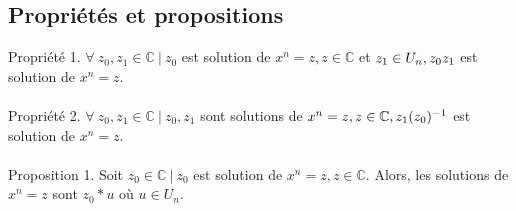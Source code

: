 \documentclass[]{article}
\begin{document}
\subsection{Propriétés et propositions}
\noindent
Propriété 1. $\forall \ z_0, z_1 \in \mathbb{C} \ | \ z_0$ est solution de $x^n = z, z \in \mathbb{C}$ et $z_1 \in U_n,
\\ z_0z_1$ est solution de $x^n = z$.
\\
\\ Propriété 2. $\forall \ z_0, z_1 \in \mathbb{C} \ | \ z_0, z_1$ sont solutions de $x^n = z, z \in \mathbb{C},
\\ z_1(z_0)^{-1}$ est solution de $x^n = z$.
\\
\\ Proposition 1. Soit  $z_0 \in \mathbb{C} \ | \ z_0$ est solution de $x^n = z, z \in \mathbb{C}$. Alors, les solutions de $x^n = z$ sont $z_0 * u$ où $u \in U_n$.
\end{document}
